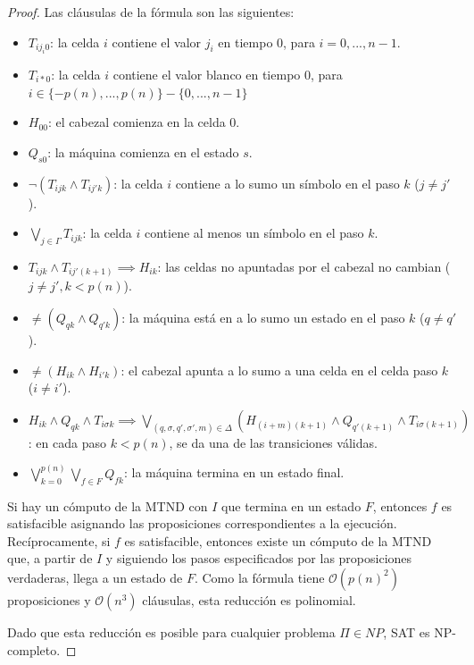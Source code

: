 \documentclass[a4paper]{report}
\newcommand{\BigO}[1]{\ensuremath{\mathcal{O}(#1)}}
\begin{document}
\begin{proof}
    Las cláusulas de la fórmula son las siguientes:
    \begin{itemize}
        \item $T_{i j_i 0}$: la celda $i$ contiene el valor $j_i$ en tiempo $0$, para $i = 0, ..., n - 1$.
        \item $T_{i \ast 0}$: la celda $i$ contiene el valor blanco en tiempo $0$, para $i \in \{-p(n), ..., p(n)\} - \{0, ..., n - 1\}$
        \item $H_{00}$: el cabezal comienza en la celda $0$.
        \item $Q_{s0}$: la máquina comienza en el estado $s$.
        \item $\neg (T_{ijk} \land T_{ij'k})$: la celda $i$ contiene a lo sumo un símbolo en el paso $k$ ($j \neq j'$).
        \item $\bigvee_{j \in \Gamma} T_{ijk}$: la celda $i$ contiene al menos un símbolo en el paso $k$.
        \item $T_{ijk} \land T_{ij'(k+1)} \implies H_{ik}$: las celdas no apuntadas por el cabezal no cambian ($j \neq j', k < p(n)$).
        \item $\neq (Q_{qk} \land Q_{q'k})$: la máquina está en a lo sumo un estado en el paso $k$ ($q \neq q'$).
        \item $\neq (H_{ik} \land H_{i'k})$: el cabezal apunta a lo sumo a una celda en el celda paso $k$ ($i \neq i'$).
        \item $H_{ik} \land Q_{qk} \land T_{i \sigma k} \implies \bigvee_{(q, \sigma, q', \sigma', m) \in \Delta} (H_{(i+m)(k + 1)} \land Q_{q'(k + 1)} \land T_{i \sigma (k + 1)})$: en cada paso $k < p(n)$, se da una de las transiciones válidas.
        \item $\bigvee_{k = 0}^{p(n)} \bigvee_{f \in F} Q_{fk}$: la máquina termina en un estado final.
    \end{itemize}

    Si hay un cómputo de la MTND con $I$ que termina en un estado $F$, entonces $f$ es satisfacible asignando las proposiciones correspondientes a la ejecución. Recíprocamente, si $f$ es satisfacible, entonces existe un cómputo de la MTND que, a partir de $I$ y siguiendo los pasos especificados por las proposiciones verdaderas, llega a un estado de $F$. Como la fórmula tiene \BigO{p(n)^2} proposiciones y \BigO{n^3} cláusulas, esta reducción es polinomial.

    Dado que esta reducción es posible para cualquier problema $\Pi \in NP$, SAT es NP-completo.
\end{proof}
\end{document}
